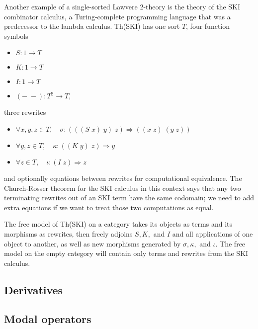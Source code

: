 \documentclass{article}
\newcommand{\maps}{\colon}
\begin{document}
Another example of a single-sorted Lawvere 2-theory is the theory of the SKI combinator calculus, a Turing-complete programming language that was a predecessor to the lambda calculus.  Th(SKI) has one sort $T$, four function symbols
\begin{itemize}
  \item $S\maps 1 \to T$
  \item $K\maps 1 \to T$
  \item $I\maps 1 \to T$
  \item $(-\;-)\maps T^2 \to T,$
\end{itemize}
three rewrites
\begin{itemize}
  \item $\forall x,y,z \in T, \quad \sigma \maps (((S\; x)\; y)\; z) \Rightarrow ((x\; z)\; (y\; z))$
  \item $\forall y,z \in T, \quad \kappa \maps ((K\; y)\; z) \Rightarrow y$
  \item $\forall z \in T, \quad \iota \maps (I\; z) \Rightarrow z$
\end{itemize}
and optionally equations between rewrites for computational equivalence.  The Church-Rosser theorem for the SKI calculus in this context says that any two terminating rewrites out of an SKI term have the same codomain; we need to add extra equations if we want to treat those two computations as equal.

The free model of Th(SKI) on a category takes its objects as terms and its morphisms as rewrites, then freely adjoins $S,K,$ and $I$ and all applications of one object to another, as well as new morphisms generated by $\sigma,\kappa,$ and $\iota.$  The free model on the empty category will contain only terms and rewrites from the SKI calculus.

\subsection{Derivatives}

\subsection{Modal operators}
\end{document}
